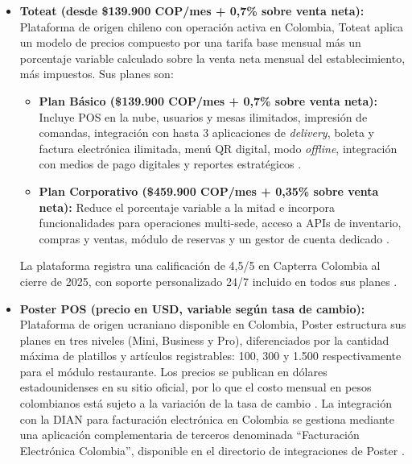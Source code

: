 \begin{itemize}
	Todos los planes incluyen capacitación, actualizaciones y soporte, y
	son compatibles con hardware genérico: tablet Android, PC, Mac,
	impresoras de tiquete, lectores de código de barras y cajones de dinero. Vendty también comercializa una versión de escritorio con
	estructura de precios diferente: el plan anual desde \$85.000 COP/mes
	(pago único anual de \$1.020.000), orientada a operaciones sin
	dependencia de navegador \cite{vendty_escritorio}. El sitio oficial
	indica adicionalmente que para establecimientos tipo restaurante puede
	aplicar un valor diferenciado al de comercios retail \cite{vendty}.
	
	\item \textbf{Toteat (desde \$139.900 COP/mes + 0,7\% sobre venta neta):}
	Plataforma de origen chileno con operación activa en Colombia, Toteat
	aplica un modelo de precios compuesto por una tarifa base mensual más
	un porcentaje variable calculado sobre la venta neta mensual del
	establecimiento, más impuestos. Sus planes son:
	
	\begin{itemize}
		\item \textbf{Plan Básico (\$139.900 COP/mes + 0,7\% sobre venta
			neta):} Incluye POS en la nube, usuarios y mesas ilimitados,
		impresión de comandas, integración con hasta 3 aplicaciones de
		\textit{delivery}, boleta y factura electrónica ilimitada, menú QR
		digital, modo \textit{offline}, integración con medios de pago
		digitales y reportes estratégicos \cite{toteat_planes}.
		\item \textbf{Plan Corporativo (\$459.900 COP/mes + 0,35\% sobre
			venta neta):} Reduce el porcentaje variable a la mitad e incorpora
		funcionalidades para operaciones multi-sede, acceso a APIs de
		inventario, compras y ventas, módulo de reservas y un gestor de
		cuenta dedicado \cite{toteat_corp}.
	\end{itemize}
	
	La plataforma registra una calificación de 4,5/5 en Capterra Colombia
	al cierre de 2025, con soporte personalizado 24/7 incluido en todos sus
	planes \cite{capterra_toteat}.
	
	\item \textbf{Poster POS (precio en USD, variable según tasa de
		cambio):}
	Plataforma de origen ucraniano disponible en Colombia, Poster estructura
	sus planes en tres niveles (Mini, Business y Pro), diferenciados por la
	cantidad máxima de platillos y artículos registrables: 100, 300 y 1.500
	respectivamente para el módulo restaurante.
	Los precios se publican en dólares estadounidenses en su sitio oficial,
	por lo que el costo mensual en pesos colombianos está sujeto a la
	variación de la tasa de cambio \cite{comparasoftware_poster}. La
	integración con la DIAN para facturación electrónica en Colombia se
	gestiona mediante una aplicación complementaria de terceros
	denominada ``Facturación Electrónica Colombia'', disponible en el
	directorio de integraciones de Poster \cite{poster_dian}.
	
\end{itemize}


